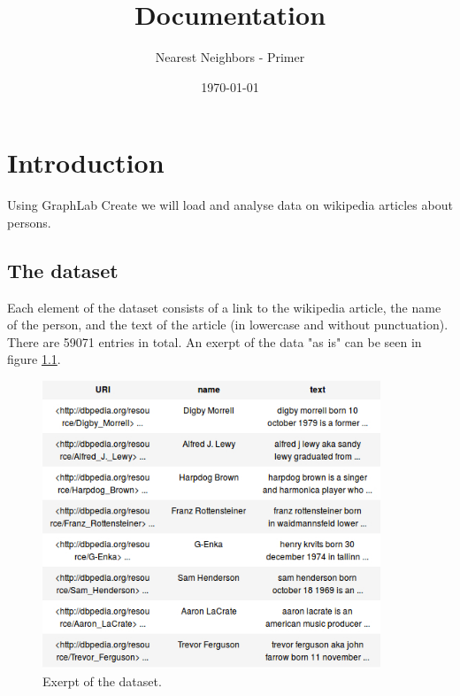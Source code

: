 \documentclass[12pt]{scrreprt}
\begin{document}
\subject{Data Science}
\title{Documentation}
\subtitle{Nearest Neighbors - Primer}
\author{}
\date{\large{\today}}
\publishers{Eicker Niklas, Halastra Szymon}
\maketitle
\tableofcontents



\chapter{Introduction} 
\label{chpt:intro}

Using GraphLab Create we will load and analyse data on wikipedia articles about persons. 

\section{The dataset}
\label{sec:data}

Each element of the dataset consists of a link to the wikipedia article, the name of the person, and the text of the article (in lowercase and without punctuation). There are 59071 entries in total. An exerpt of the data "as is" can be seen in figure \ref{fig:dataset_raw}.\\


\begin{figure}[H]
  \begin{center}
    \caption{Exerpt of the dataset.}
    \label{fig:dataset_raw}
    \includegraphics[width=0.9\textwidth, angle=0]{raw_data.jpg}
  \end{center}
\end{figure}
\end{document}
